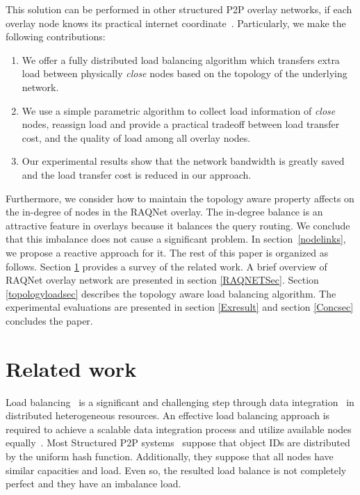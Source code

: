\documentclass {article}
\begin{document}
This solution can be performed in other structured  P2P overlay networks, if each overlay node knows its  practical internet coordinate~\cite{PIC}.
Particularly, we make the following contributions:
\begin{enumerate}
    \item We offer a fully distributed load balancing algorithm which transfers extra load   between physically  \emph{close} nodes based on the topology of the underlying network.
\item We use a simple parametric algorithm to collect load information of \emph{close} nodes, reassign load and provide  a practical tradeoff between load transfer cost, and the quality of load among all overlay nodes.
\item Our experimental results show that the network bandwidth is greatly saved and the load transfer cost is reduced in our approach.
\end{enumerate}

Furthermore, we consider how to maintain the topology aware property affects on the in-degree of nodes in the RAQNet overlay. The in-degree balance is an attractive feature in overlays because it balances the query routing. We conclude that this imbalance does not cause a significant problem.
In section~\ref{nodelinks},  we propose a reactive approach for it.
The rest of this paper is organized as follows.
Section \ref{relatedwork} provides a survey of the related work.
A brief overview of RAQNet overlay network are presented in section \ref{RAQNETSec}. Section \ref{topologyloadsec} describes the topology aware load balancing algorithm. The experimental evaluations are presented in section \ref{Exresult} and section \ref{Concsec} concludes the paper.


\section{Related work}\label{relatedwork}
Load balancing~\cite{disloadbalancing,loadbalancesp,proximity-Awareload,loadbalancedsp} is a significant and challenging step through data integration~\cite{OAEI,Consolidation,ConreferenceResolution} in distributed heterogeneous resources. An effective load balancing approach is required to achieve a scalable data integration process and utilize available nodes equally~\cite{Kolb}.
Most Structured P2P systems~\cite{pastry,CAN,chord} suppose that object IDs are distributed by the uniform hash function. Additionally, they suppose that all nodes have similar capacities and load. Even so, the resulted load balance is not completely perfect and they have an  imbalance load.
\end{document}
